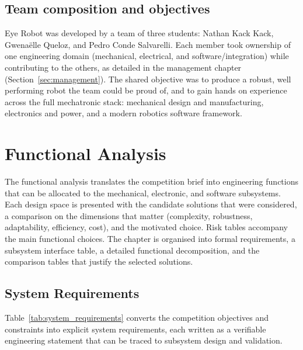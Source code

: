 \documentclass[11pt]{article}
\begin{document}
\subsection{Team composition and objectives}
Eye Robot was developed by a team of three students: Nathan Kack Kack, Gwena\"elle Queloz, and Pedro Conde Salvarelli. Each member took ownership of one engineering domain (mechanical, electrical, and software/integration) while contributing to the others, as detailed in the management chapter (Section~\ref{sec:management}). The shared objective was to produce a robust, well performing robot the team could be proud of, and to gain hands on experience across the full mechatronic stack: mechanical design and manufacturing, electronics and power, and a modern robotics software framework.

\section{Functional Analysis}\label{sec:functional_analysis}

The functional analysis translates the competition brief into engineering functions that can be allocated to the mechanical, electronic, and software subsystems. Each design space is presented with the candidate solutions that were considered, a comparison on the dimensions that matter (complexity, robustness, adaptability, efficiency, cost), and the motivated choice. Risk tables accompany the main functional choices. The chapter is organised into formal requirements, a subsystem interface table, a detailed functional decomposition, and the comparison tables that justify the selected solutions.

\subsection{System Requirements}
Table~\ref{tab:system_requirements} converts the competition objectives and constraints into explicit system requirements, each written as a verifiable engineering statement that can be traced to subsystem design and validation.
\end{document}
